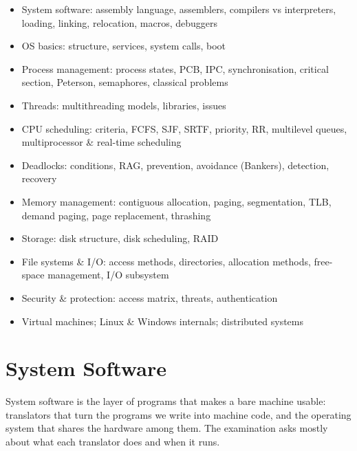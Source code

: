 

\begin{sylbox}

\begin{itemize}
\tightlist
\item[$\square$]
  System software: assembly language, assemblers, compilers vs interpreters, loading, linking, relocation, macros, debuggers
\item[$\square$]
  OS basics: structure, services, system calls, boot
\item[$\square$]
  Process management: process states, PCB, IPC, synchronisation, critical section, Peterson, semaphores, classical problems
\item[$\square$]
  Threads: multithreading models, libraries, issues
\item[$\square$]
  CPU scheduling: criteria, FCFS, SJF, SRTF, priority, RR, multilevel queues, multiprocessor \& real-time scheduling
\item[$\square$]
  Deadlocks: conditions, RAG, prevention, avoidance (Banker\textquotesingle s), detection, recovery
\item[$\square$]
  Memory management: contiguous allocation, paging, segmentation, TLB, demand paging, page replacement, thrashing
\item[$\square$]
  Storage: disk structure, disk scheduling, RAID
\item[$\square$]
  File systems \& I/O: access methods, directories, allocation methods, free-space management, I/O subsystem
\item[$\square$]
  Security \& protection: access matrix, threats, authentication
\item[$\square$]
  Virtual machines; Linux \& Windows internals; distributed systems
\end{itemize}

\end{sylbox}

\needspace{125pt}

\hypertarget{p2-05--1-system-software}{%
\section{System Software}\label{p2-05--1-system-software}}

System software is the layer of programs that makes a bare machine usable: translators that turn the
programs we write into machine code, and the operating system that shares the hardware among them. The
examination asks mostly about what each translator does and when it runs.

